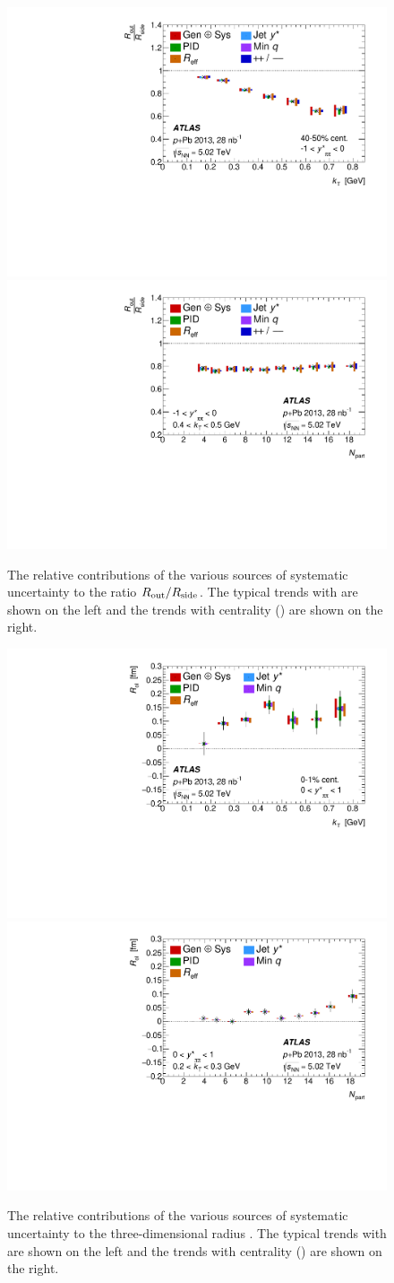 \begin{figure}[t]
\centering
\includegraphics[width=0.49\linewidth]{canqosl_RoutOverRside_vs_kt_systs.pdf}
\includegraphics[width=0.49\linewidth]{canqosl_RoutOverRside_vs_npart_systs.pdf}\\
\caption{The relative contributions of the various sources of systematic uncertainty to the ratio $R_{\mathrm{out}} / R_{\mathrm{side}}$. The typical trends with \kt are shown on the left and the trends with centrality (\Npart) are shown on the right.}
\label{fig:syst_rout_over_rside}
\end{figure}

\begin{figure}[t]
\centering
\includegraphics[width=0.49\linewidth]{canqosl_Rol_vs_kt_systs.pdf}
\includegraphics[width=0.49\linewidth]{canqosl_Rol_vs_npart_systs.pdf}\\
\caption{The relative contributions of the various sources of systematic uncertainty to the three-dimensional radius \Rol. The typical trends with \kt are shown on the left and the trends with centrality (\Npart) are shown on the right.}
\label{fig:syst_rol}
\end{figure}

